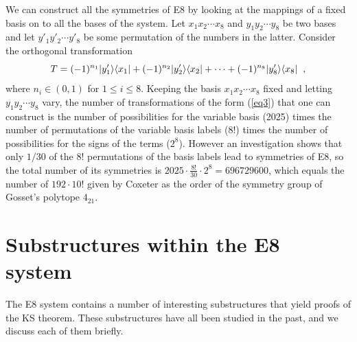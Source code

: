 We can construct all the symmetries of E8 by looking at the mappings of a fixed basis on to all the bases of the system. Let $x_{1} x_{2} \cdots x_{8}$ and $y_{1} y_{2} \cdots y_{8}$ be two bases and let $y'_{1} y'_{2} \cdots y'_{8}$ be some permutation of the numbers in the latter. Consider the orthogonal transformation
\begin{equation}
T= (-1)^{n_{1}}|y'_{1}\rangle \langle x_{1}|+(-1)^{n_{2}}|y'_{2} \rangle \langle x_{2}|+\cdots+(-1)^{n_{8}}|y'_{8}\rangle \langle x_{8}| \hspace{2mm} ,
\label{eq3}
\end{equation}
where $n_{i}\in (0,1)$ for $1 \leq i \leq 8$. Keeping the basis $x_{1} x_{2} \cdots x_{8}$ fixed and letting $y_{1} y_{2} \cdots y_{8}$ vary, the number of transformations of the form (\ref{eq3}) that one can construct is the number of possibilities for the variable basis (2025) times the number of permutations of the variable basis labels ($8!$) times the number of possibilities for the signs of the terms ($2^{8}$). However an investigation shows that only $1/30$ of the $8!$ permutations of the basis labels lead to symmetries of E8, so the total number of its symmetries is $2025\cdot\frac{8!}{30}\cdot2^{8}=696729600$, which equals the number of $192\cdot 10!$ given by Coxeter\cite{coxeter} as the order of the symmetry group of Gosset's polytope $4_{21}$.

\section{\label{sec:3}Substructures within the E8 system}

The E8 system contains a number of interesting substructures that yield proofs of the KS theorem. These substructures have all been studied in the past, and we discuss each of them briefly. \\

